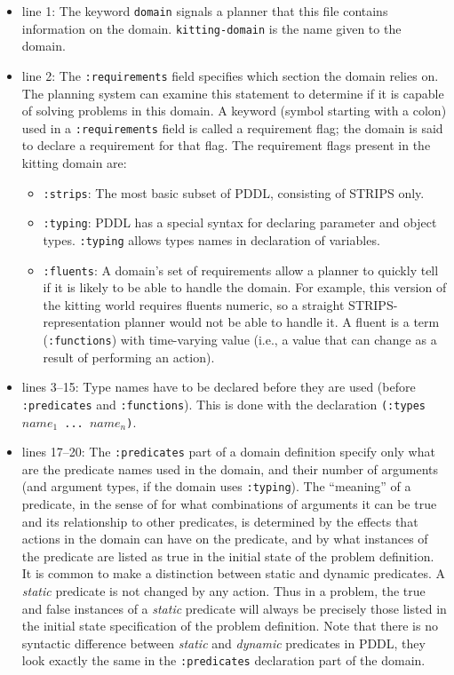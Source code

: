 \begin{itemize}
\item line 1: The keyword \texttt{domain} signals a planner that this file contains information on the domain. \texttt{kitting-domain} is the name given to the domain.
\item line 2: The \texttt{:requirements} field specifies which section the domain relies on. The planning system can examine this statement to determine if it is capable of solving problems in this domain. A keyword (symbol starting with a colon) used in a \texttt{:requirements} field is called a requirement flag; the domain is said to declare a requirement for that flag. The requirement flags present in the kitting domain are:
\begin{itemize}
\item \texttt{:strips}: The most basic subset of PDDL, consisting of STRIPS only.
\item \texttt{:typing}: PDDL has a special syntax for declaring parameter and object types. \texttt{:typing} allows types names in declaration of variables.
\item \texttt{:fluents}: A domain's set of requirements allow a planner to quickly tell if it is likely to be able
to handle the domain. For example, this version of the kitting world requires fluents numeric, so a straight STRIPS-representation planner would not be able to handle it. A fluent is a term (\texttt{:functions}) with time-varying value (i.e., a value that can change as a result of performing an action).
\end{itemize}
\item lines 3--15:  Type names have to be declared before they are used (before \texttt{:predicates} and \texttt{:functions}). This is done with the declaration \texttt{(:types $name_1$ ... $name_n$)}.
\item lines 17--20: The \texttt{:predicates} part of a domain definition specify only what are the predicate names used in the domain, and their number of arguments (and argument types, if the domain uses \texttt{:typing}). The ``meaning'' of a predicate, in the sense of for what combinations of arguments it can be true and its relationship to other predicates, is determined by the effects that actions in the domain can have on the predicate, and by what instances of the predicate are listed as true in the initial state of the problem definition.\\
    It is common to make a distinction between static and dynamic predicates. A \textit{static} predicate is not changed by any action. Thus in a problem, the true and false instances of a \textit{static} predicate will always be precisely those listed in the initial state specification of the problem definition. Note that there is no syntactic difference between \textit{static} and \textit{dynamic} predicates in PDDL, they look exactly the same in the \texttt{:predicates} declaration part of the domain.\\

\end{itemize}
